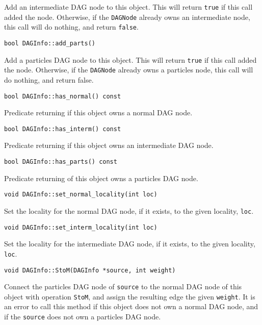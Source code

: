 \noindent Add an intermediate DAG node to this object. This will return
\texttt{true} if this call added the node. Otherwise, if the \texttt{DAGNode}
already owns an intermediate node, this call will do nothing, and return
\texttt{false}.

\begin{lstlisting}
bool DAGInfo::add_parts()
\end{lstlisting}

\noindent Add a particles DAG node to this object. This will return
\texttt{true} if this call added the node. Otherwise, if the \texttt{DAGNode}
already owns a particles node, this call will do nothing, and return false.

\begin{lstlisting}
bool DAGInfo::has_normal() const
\end{lstlisting}

\noindent Predicate returning if this object owns a normal DAG node.

\begin{lstlisting}
bool DAGInfo::has_interm() const
\end{lstlisting}

\noindent Predicate returning if this object owns an intermediate DAG node.

\begin{lstlisting}
bool DAGInfo::has_parts() const
\end{lstlisting}

\noindent Predicate returning of this object owns a particles DAG node.

\begin{lstlisting}
void DAGInfo::set_normal_locality(int loc)
\end{lstlisting}

\noindent Set the locality for the normal DAG node, if it exists, to the given
locality, \texttt{loc}.

\begin{lstlisting}
void DAGInfo::set_interm_locality(int loc)
\end{lstlisting}

\noindent Set the locality for the intermediate DAG node, if it exists, to
the given locality, \texttt{loc}.

\begin{lstlisting}
void DAGInfo::StoM(DAGInfo *source, int weight)
\end{lstlisting}

\noindent Connect the particles DAG node of \texttt{source} to the normal DAG
node of this object with operation \texttt{StoM}, and assign the resulting
edge the given \texttt{weight}. It is an error to call this method if this
object does not own a normal DAG node, and if the \texttt{source} does not
own a particles DAG node.

